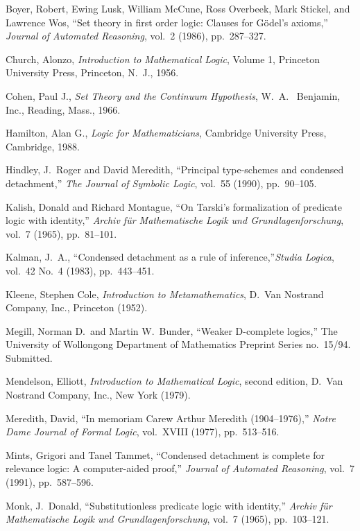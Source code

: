 \documentclass[leqno]{article}
\begin{document}
\begin{thebibliography}{99}

 Boyer, Robert, Ewing Lusk, William McCune, Ross Overbeek,
Mark Stickel, and Lawrence Wos, ``Set theory in first order logic:  Clauses
for G\"{o}del's axioms,'' {\em Journal of Automated Reasoning}, vol.\ 2
(1986), pp.\ 287--327.

 Church, Alonzo, {\em Introduction to Mathematical Logic},
Volume 1,  Princeton University Press, Princeton, N.~J., 1956.

 Cohen, Paul J., {\em Set Theory and the Continuum Hypothesis},
W.~A.~ Benjamin, Inc., Reading, Mass., 1966.

 Hamilton, Alan G., {\em Logic for Mathematicians},
Cambridge University  Press, Cambridge, 1988.

 Hindley, J.~Roger and David Meredith, ``Principal
type-schemes and  condensed detachment,'' {\em The Journal of Symbolic Logic},
vol.\ 55 (1990),  pp.\ 90--105.

 Kalish, Donald and Richard Montague, ``On Tarski's
formalization of predicate logic with identity,'' {\em  Archiv f{\"{u}}r
Mathematische Logik und Grundlagenforschung}, vol.\ 7 (1965),  pp.\ 81--101.

 Kalman, J.~A., ``Condensed detachment as a rule of
inference,''{\em Studia  Logica}, vol.\ 42 No.\ 4 (1983), pp.\ 443--451.

 Kleene, Stephen Cole, {\em Introduction to Metamathematics},
D.~Van  Nostrand Company, Inc., Princeton (1952).

 Megill, Norman D.\ and Martin W.~Bunder, ``Weaker D-complete
logics,'' The University of Wollongong Department of Mathematics Preprint
Series no.\ 15/94.  Submitted.

 Mendelson, Elliott, {\em Introduction to Mathematical
Logic}, second edition, D.~Van Nostrand Company, Inc., New York (1979).

 Meredith, David, ``In memoriam Carew Arthur Meredith
(1904--1976),'' {\em  Notre Dame Journal of Formal Logic}, vol.\ XVIII (1977),
pp.\ 513--516.

 Mints, Grigori and Tanel Tammet, ``Condensed detachment is
complete for relevance logic:  A computer-aided proof,'' {\em Journal of
Automated Reasoning}, vol.\ 7 (1991), pp.\ 587--596.

 Monk, J.~Donald, ``Substitutionless predicate logic with
identity,'' {\em  Archiv f{\"{u}}r Mathematische Logik und
Grundlagenforschung}, vol.\ 7 (1965),  pp.\ 103--121.


\end{thebibliography}
\end{document}
